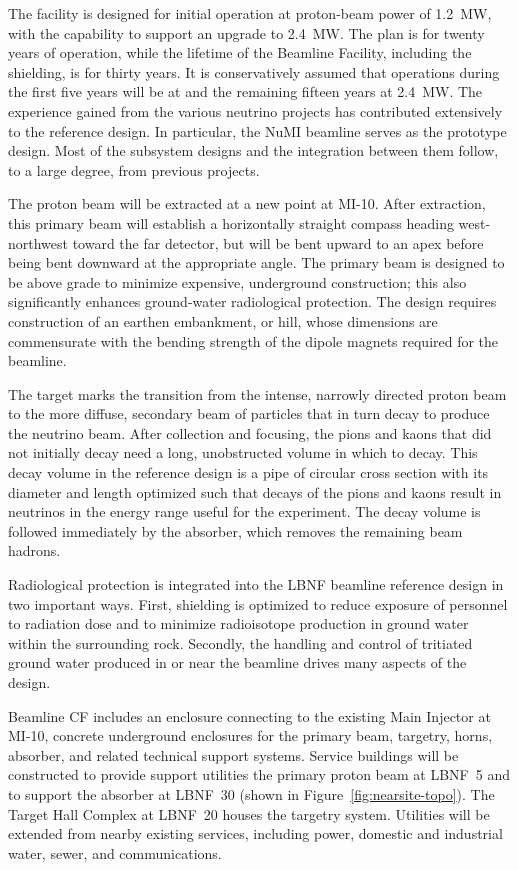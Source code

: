 The facility is designed for initial operation at proton-beam power of \SI{1.2}{\MW}, with the capability to support an upgrade to \SI{2.4}{\MW}. The plan is for twenty years of operation, while the lifetime of the Beamline Facility, including the shielding, is for thirty years. It is conservatively assumed that operations during the first five years will be at  and the remaining fifteen years at \SI{2.4}{\MW}.  
The experience gained from the various neutrino projects has contributed extensively to the reference design. In particular, the NuMI beamline serves as the prototype design. Most of the subsystem designs and the integration between them follow, to a large degree, from previous projects. 
 
The proton beam will be extracted at a new point at MI-10. After extraction, this primary beam will establish a horizontally straight compass heading west-northwest toward the far detector, but will be bent upward to an apex before being bent downward at the appropriate angle. The primary beam is designed to be above grade to minimize expensive, underground construction; this also significantly enhances ground-water radiological protection. The design requires construction of an earthen embankment, or hill, whose dimensions are commensurate with the bending strength of the dipole magnets required for the beamline. 
 
The target marks the transition from the intense, narrowly directed proton beam to the more diffuse, secondary beam of particles that in turn decay to produce the neutrino beam. After collection and focusing, the pions and kaons that did not initially decay need a long, unobstructed volume in which to decay. This decay volume in the reference design is a pipe of circular cross section with its diameter and length optimized such that decays of the pions and kaons result in neutrinos in the energy range useful for the experiment. The decay volume is followed immediately by the absorber, which removes the remaining beam hadrons. 
 
Radiological protection is integrated into the LBNF beamline reference design in two important ways. First, shielding is optimized to reduce exposure of personnel to radiation dose and to minimize radioisotope production in ground water within the surrounding rock. Secondly, the handling and control of tritiated ground water produced in or near the beamline drives many aspects of the design. 
 
Beamline CF includes an enclosure connecting to the existing Main Injector at MI-10, concrete underground enclosures for the primary beam, targetry, horns, absorber, and related technical support systems. Service buildings will be constructed to provide support utilities the primary proton beam at LBNF~5 and to support the absorber at LBNF~30 (shown in Figure~\ref{fig:nearsite-topo}).  The Target Hall Complex at LBNF~20 houses the targetry system.  Utilities will be extended from nearby existing services, including power, domestic and industrial water, sewer, and communications. 
 
